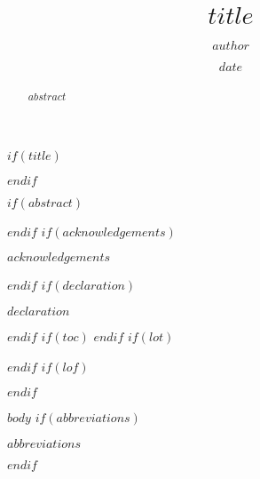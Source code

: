 \documentclass[11pt,twoside]{bristolthesis}
\title{$title$}
\author{$author$}
\date{$date$}
\begin{document}
$if(title)$
  \maketitle
$endif$

\frontmatter %
\pagestyle{empty} %
$if(abstract)$
  \begin{abstract}
    $abstract$
  \end{abstract}
$endif$
$if(acknowledgements)$
  \begin{acknowledgements}
    $acknowledgements$
  \end{acknowledgements}
$endif$
$if(declaration)$
  \begin{declaration}
    $declaration$
  \end{declaration}
$endif$
$if(toc)$
  \hypersetup{linkcolor=$if(toccolor)$$toccolor$$else$black$endif$}
  {
  \setcounter{tocdepth}{$toc-depth$}
  \setcounter{secnumdepth}{$toc-depth$}
  \tableofcontents
  }
$endif$
$if(lot)$
  \listoftables
$endif$
$if(lof)$
  \listoffigures
$endif$

\mainmatter %
\pagestyle{plain}
$body$
$if(abbreviations)$
  \begin{abbreviations}
    $abbreviations$
  \end{abbreviations}
$endif$
\end{document}
